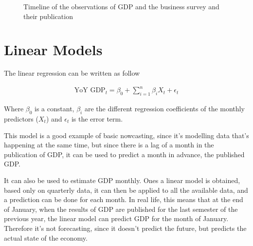 \documentclass[12pt,a4paper,oneside]{book}
\newcommand{\ImageWidth}{11cm}
\begin{document}
\begin{figure}[!htp]
     \centering \footnotesize
{}
    \caption{Timeline of the observations of GDP and the business survey and their publication}
    \label{fig:time of the data}
\end{figure}


\section{Linear Models}

The linear regression can be written as follow

\begin{eqnarray}
    \text{YoY GDP}_{t} = \beta_0 + \sum^n_{i = 1}
       \beta_{i} X_{t} + \epsilon_t 
\end{eqnarray}

Where $\beta_{0}$ is a constant, $\beta_{i}$ are the different regression coefficients of the monthly predictors ($X_{t}$) and $\epsilon_t$ is the error term.

This model is a good example of basic nowcasting, since it's modelling data that's happening at the same time, but since there is a lag of a month in the publication of GDP, it can be used to predict a month in advance, the published GDP.

It can also be used to estimate GDP monthly. Ones a linear model is obtained, based only on quarterly data, it can then be applied to all the available data, and a prediction can be done for each month.
In real life, this means that at the end of January, when the results of GDP are published for the last semester of the previous year, the linear model can predict GDP for the month of January. Therefore it's not forecasting, since it doesn't predict the future, but predicts the actual state of the economy.
\end{document}
